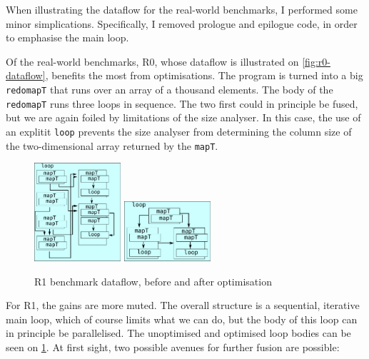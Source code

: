 When illustrating the dataflow for the real-world benchmarks, I
performed some minor simplications.  Specifically, I removed prologue
and epilogue code, in order to emphasise the main loop.

Of the real-world benchmarks, R0, whose dataflow is illustrated on
\cref{fig:r0-dataflow}, benefits the most from optimisations.  The
program is turned into a big \texttt{redomapT} that runs over an array
of a thousand elements.  The body of the \texttt{redomapT} runs three
loops in sequence.  The two first could in principle be fused, but we
are again foiled by limitations of the size analyser.  In this case,
the use of an explitit \texttt{loop} prevents the size analyser from
determining the column size of the two-dimensional array returned by
the \texttt{mapT}.

\begin{figure}
\begin{center}
\includegraphics[width=3.2cm]{img/HiperfitEgCos-unfused.pdf}
\hspace{1cm}
\includegraphics[width=3.2cm]{img/HiperfitEgCos-fused.pdf}
\end{center}
\caption{R1 benchmark dataflow, before and after optimisation}
\label{fig:r1-dataflow}
\end{figure}

For R1, the gains are more muted.  The overall structure is a
sequential, iterative main loop, which of course limits what we can
do, but the body of this loop can in principle be parallelised.  The
unoptimised and optimised loop bodies can be seen on
\cref{fig:r1-dataflow}.  At first sight, two possible avenues for
further fusion are possible:

